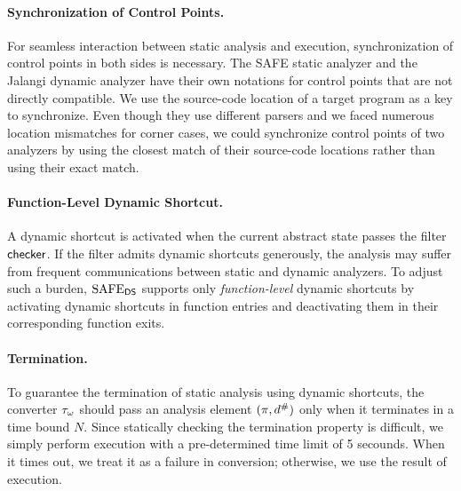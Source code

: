 \paragraph{Synchronization of Control Points.}
For seamless interaction between static analysis and {\sealed} execution,
synchronization of control points in both sides is necessary.
The SAFE static analyzer and the Jalangi dynamic analyzer
have their own notations for control points that are not directly
compatible.
We use the source-code location of a target program as a key to synchronize.
Even though they use different parsers and we faced numerous location mismatches for corner cases,
we could synchronize control points of two analyzers by using the closest match
of their source-code locations rather than using their exact match.

\paragraph{Function-Level Dynamic Shortcut.}
A dynamic shortcut is activated when the current abstract state passes the
filter $\textsf{checker}$.  If the filter admits dynamic shortcuts generously, the
analysis may suffer from frequent communications between static and dynamic
analyzers.  To adjust such a burden, $\text{SAFE}_{\textsf{DS}}$ supports only \textit{function-level} dynamic
shortcuts by activating dynamic shortcuts in function entries and deactivating them
in their corresponding function exits.

\paragraph{Termination.}
To guarantee the termination of static analysis using dynamic shortcuts, the
converter ${\tau}_\omega$ should pass an analysis element $(\pi, {d}^{\#})$
only when it terminates in a time bound $N$.  Since statically checking the
termination property is difficult, we simply perform {\sealed}
execution with a pre-determined time limit of 5 secounds.
When it times out, we treat it as a failure in conversion;
otherwise, we use the result of {\sealed} execution.




